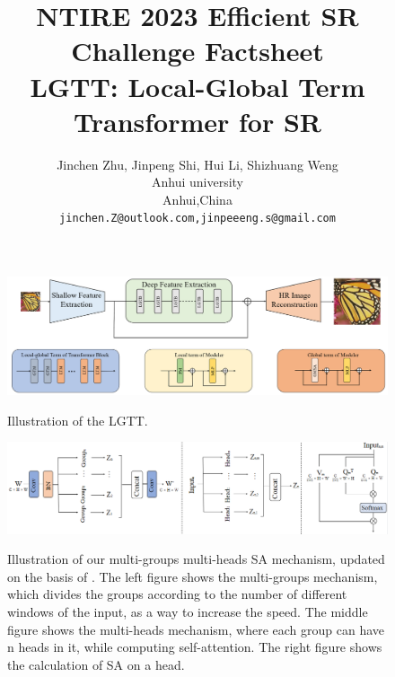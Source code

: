 \documentclass[10pt,twocolumn,letterpaper]{article}
\begin{document}
\title{NTIRE 2023 Efficient SR Challenge Factsheet \\
	LGTT: Local-Global Term Transformer for SR}

\author{Jinchen Zhu, Jinpeng Shi, Hui Li, Shizhuang Weng\\
Anhui university\\
Anhui,China\\
{\tt\small jinchen.Z@outlook.com,jinpeeeng.s@gmail.com}
}
\maketitle

\begin{figure}[htp]
	\centering
	\centering
	\includegraphics[width=1\linewidth]{Image/Arch}
	\label{trans_sparse}%
	\caption{Illustration of the LGTT.
	}
	\label{arch}
\end{figure}
\begin{figure}[htp]
	\centering
	\centering
	\includegraphics[width=1\linewidth]{Image/multi_sa}
	\label{trans_sparse}%
	\caption {Illustration of our multi-groups multi-heads SA mechanism, updated on the basis of \cite{ESWT}. The left figure shows
	the multi-groups mechanism, which divides the groups according to the number of different windows of the input, as a way
	to increase the speed. The middle figure shows the multi-heads mechanism, where each group can have n heads in it, while
	computing self-attention. The right figure shows the calculation of SA on a head.
	}
	\label{GMSA}
\end{figure}
\end{document}

